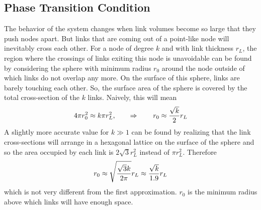 \documentclass[endfloats,nofootinbib,preprint,floatfix,titlepage,superscriptaddress,linenumbers]{revtex4-1} %
\newcommand{\outNim}[1]{}
\begin{document}
{%


\subsection{Phase Transition Condition}

The behavior of the system changes when link volumes become so large that they push nodes apart. 
But links that are coming out of a point-like node will inevitably cross each other. 
For a node of degree $k$ and with link thickness $r_L$, the region where the crossings of links exiting this node is unavoidable can be found by considering the sphere with minimum radius $r_0$ around the node outside of which links do not overlap any more. 
On the surface of this sphere, links are barely touching each other. 
So, the surface area of the sphere is covered by the total cross-section of the $k$ links. 
Naively, this will mean 
\[4\pi r_0^2 \approx k \pi r_L^2,\qquad \Rightarrow \qquad r_0 \approx {\sqrt{k}\over 2} r_L  \]
A slightly more accurate value for $k\gg 1$ can be found by realizing that the link cross-sections will arrange in a hexagonal lattice on the surface of the sphere and so the area occupied by each link is $2\sqrt{3} r_L^2$ instead of $\pi r_L^2$. 
Therefore
\[r_0 \approx  \sqrt{{ \sqrt{3} k \over 2\pi }} r_L \approx {\sqrt{k}\over 1.9 } r_L\]
which is not very different from the first approximation. 
$r_0$ is the minimum radius above which links will have enough space. 
\outNim{
Thus, if $r_0$ becomes comparable to the radius of the network based on close-packing the nodes, i.e. $R\sim N^{1/3} r_N$, the layout will transition to strong interaction phase. 
However, we need to consider the fact that not all nodes connected to the central node will be a distance larger than $r_0$ away from it. 
Based on this, the minimum size of a region over which we look for crossings around a degree $k$ nodes must be larger than $r_0(k,r_L)$.
}%

}
\end{document}
